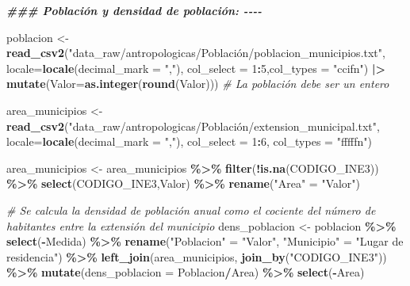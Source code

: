 \documentclass[12pt,a4paper,]{book}
\newenvironment{Shaded}{\begin{snugshade}}{\end{snugshade}}
\newcommand{\AttributeTok}[1]{\textcolor[rgb]{0.13,0.29,0.53}{#1}}
\newcommand{\CommentTok}[1]{\textcolor[rgb]{0.56,0.35,0.01}{\textit{#1}}}
\newcommand{\DecValTok}[1]{\textcolor[rgb]{0.00,0.00,0.81}{#1}}
\newcommand{\DocumentationTok}[1]{\textcolor[rgb]{0.56,0.35,0.01}{\textbf{\textit{#1}}}}
\newcommand{\FunctionTok}[1]{\textcolor[rgb]{0.13,0.29,0.53}{\textbf{#1}}}
\newcommand{\NormalTok}[1]{#1}
\newcommand{\OtherTok}[1]{\textcolor[rgb]{0.56,0.35,0.01}{#1}}
\newcommand{\SpecialCharTok}[1]{\textcolor[rgb]{0.81,0.36,0.00}{\textbf{#1}}}
\newcommand{\StringTok}[1]{\textcolor[rgb]{0.31,0.60,0.02}{#1}}
\numberwithin{dummy}{section}
\theoremstyle{ocrenumbox}
\theoremstyle{blacknumex}
\theoremstyle{blacknumbox}
\theoremstyle{ocrenum}
\theoremstyle{ocrenum}
\begin{document}
\begin{Shaded}
\begin{Highlighting}[]
  \DocumentationTok{\#\#\# Población y densidad de población: {-}{-}{-}{-}}
  
\NormalTok{  poblacion }\OtherTok{\textless{}{-}} \FunctionTok{read\_csv2}\NormalTok{(}\StringTok{"data\_raw/antropologicas/Población/poblacion\_municipios.txt"}\NormalTok{,}
                         \AttributeTok{locale=}\FunctionTok{locale}\NormalTok{(}\AttributeTok{decimal\_mark =} \StringTok{","}\NormalTok{),}
                         \AttributeTok{col\_select =} \DecValTok{1}\SpecialCharTok{:}\DecValTok{5}\NormalTok{,}\AttributeTok{col\_types =} \StringTok{"ccifn"}\NormalTok{) }\SpecialCharTok{|\textgreater{}} 
    \FunctionTok{mutate}\NormalTok{(}\AttributeTok{Valor=}\FunctionTok{as.integer}\NormalTok{(}\FunctionTok{round}\NormalTok{(Valor))) }\CommentTok{\# La población debe ser un entero}
  
  
\NormalTok{  area\_municipios }\OtherTok{\textless{}{-}} \FunctionTok{read\_csv2}\NormalTok{(}\StringTok{"data\_raw/antropologicas/Población/extension\_municipal.txt"}\NormalTok{,}
                               \AttributeTok{locale=}\FunctionTok{locale}\NormalTok{(}\AttributeTok{decimal\_mark =} \StringTok{","}\NormalTok{),}
                               \AttributeTok{col\_select =} \DecValTok{1}\SpecialCharTok{:}\DecValTok{6}\NormalTok{, }\AttributeTok{col\_types =} \StringTok{"fffffn"}\NormalTok{)}

\NormalTok{  area\_municipios }\OtherTok{\textless{}{-}}\NormalTok{ area\_municipios }\SpecialCharTok{\%\textgreater{}\%} 
    \FunctionTok{filter}\NormalTok{(}\SpecialCharTok{!}\FunctionTok{is.na}\NormalTok{(CODIGO\_INE3)) }\SpecialCharTok{\%\textgreater{}\%} 
    \FunctionTok{select}\NormalTok{(CODIGO\_INE3,Valor) }\SpecialCharTok{\%\textgreater{}\%} 
    \FunctionTok{rename}\NormalTok{(}\StringTok{"Area"} \OtherTok{=} \StringTok{"Valor"}\NormalTok{)}
  
  \CommentTok{\# Se calcula la densidad de población anual como el cociente del número de habitantes entre la extensión del municipio}
\NormalTok{  dens\_poblacion }\OtherTok{\textless{}{-}}\NormalTok{ poblacion }\SpecialCharTok{\%\textgreater{}\%} 
    \FunctionTok{select}\NormalTok{(}\SpecialCharTok{{-}}\NormalTok{Medida) }\SpecialCharTok{\%\textgreater{}\%} 
    \FunctionTok{rename}\NormalTok{(}\StringTok{"Poblacion"} \OtherTok{=} \StringTok{"Valor"}\NormalTok{,}
           \StringTok{"Municipio"} \OtherTok{=} \StringTok{"Lugar de residencia"}\NormalTok{) }\SpecialCharTok{\%\textgreater{}\%} 
    \FunctionTok{left\_join}\NormalTok{(area\_municipios,}
              \FunctionTok{join\_by}\NormalTok{(}\StringTok{"CODIGO\_INE3"}\NormalTok{)) }\SpecialCharTok{\%\textgreater{}\%} 
    \FunctionTok{mutate}\NormalTok{(}\AttributeTok{dens\_poblacion =}\NormalTok{ Poblacion}\SpecialCharTok{/}\NormalTok{Area) }\SpecialCharTok{\%\textgreater{}\%} 
    \FunctionTok{select}\NormalTok{(}\SpecialCharTok{{-}}\NormalTok{Area)}
  

\end{Highlighting}
\end{Shaded}
\end{document}
